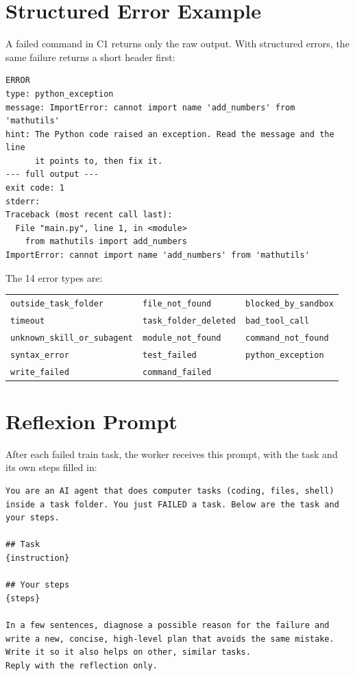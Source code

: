 \section{Structured Error Example}
\label{app:errors}

A failed command in C1 returns only the raw output. With structured errors, the same failure
returns a short header first:
\begin{verbatim}
ERROR
type: python_exception
message: ImportError: cannot import name 'add_numbers' from 'mathutils'
hint: The Python code raised an exception. Read the message and the line
      it points to, then fix it.
--- full output ---
exit code: 1
stderr:
Traceback (most recent call last):
  File "main.py", line 1, in <module>
    from mathutils import add_numbers
ImportError: cannot import name 'add_numbers' from 'mathutils'
\end{verbatim}
The 14 error types are:
\begin{center}
\small
\begin{tabular}{lll}
\texttt{outside\_task\_folder} & \texttt{file\_not\_found} & \texttt{blocked\_by\_sandbox} \\
\texttt{timeout} & \texttt{task\_folder\_deleted} & \texttt{bad\_tool\_call} \\
\texttt{unknown\_skill\_or\_subagent} & \texttt{module\_not\_found} & \texttt{command\_not\_found} \\
\texttt{syntax\_error} & \texttt{test\_failed} & \texttt{python\_exception} \\
\texttt{write\_failed} & \texttt{command\_failed} & \\
\end{tabular}
\end{center}

\section{Reflexion Prompt}
\label{app:reflexion}

After each failed train task, the worker receives this prompt, with the task and its own steps
filled in:
\begin{verbatim}
You are an AI agent that does computer tasks (coding, files, shell)
inside a task folder. You just FAILED a task. Below are the task and
your steps.

## Task
{instruction}

## Your steps
{steps}

In a few sentences, diagnose a possible reason for the failure and
write a new, concise, high-level plan that avoids the same mistake.
Write it so it also helps on other, similar tasks.
Reply with the reflection only.
\end{verbatim}

